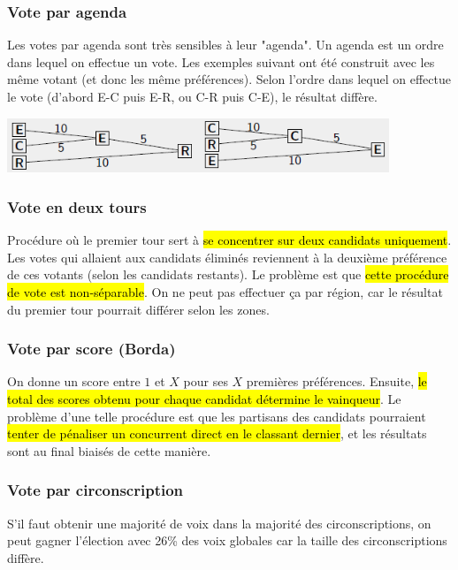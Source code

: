 \documentclass[a4paper, 12pt]{article}
\newcommand{\alinea}{
\hspace*{0.5cm}}
\begin{document}
		\subsubsection{Vote par agenda}
			\alinea Les votes par agenda sont très sensibles à leur "agenda". Un agenda est un ordre dans lequel on effectue un vote. 
				Les exemples suivant ont été construit avec les même votant (et donc les même préférences). Selon l'ordre
				dans lequel on effectue le vote (d'abord E-C puis E-R, ou C-R puis C-E), le résultat diffère.
			\begin{center}
				\includegraphics[width=4.5in]{Images/agenda}
			\end{center}
		\subsubsection{Vote en deux tours}
			\alinea Procédure où le premier tour sert à \hl{se concentrer sur deux candidats uniquement}. Les votes qui allaient 
				aux candidats éliminés reviennent à la deuxième préférence de ces votants (selon les candidats restants).
				Le problème est que \hl{cette procédure de vote est non-séparable}. On ne peut pas effectuer ça par région, car le 
				résultat du premier tour pourrait différer selon les zones.
		\subsubsection{Vote par score (Borda)}
			\alinea On donne un score entre $1$ et $X$ pour ses $X$ premières préférences. Ensuite, \hl{le total des scores obtenu pour 
				chaque candidat détermine le vainqueur}. Le problème d'une telle procédure est que les partisans des candidats pourraient
				\hl{tenter de pénaliser un concurrent direct en le classant dernier}, et les résultats sont au final biaisés de 
				cette manière.
		\subsubsection{Vote par circonscription}
			\alinea S'il faut obtenir une majorité de voix dans la majorité des circonscriptions, on peut gagner l'élection avec
				26\% des voix globales car la taille des circonscriptions diffère.
\end{document}
